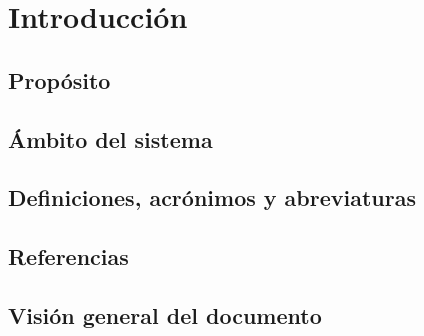 \chapter{Introducción}

\section{Propósito}

\section{Ámbito del sistema}

\section{Definiciones, acrónimos y abreviaturas}

\section{Referencias}

\section{Visión general del documento}